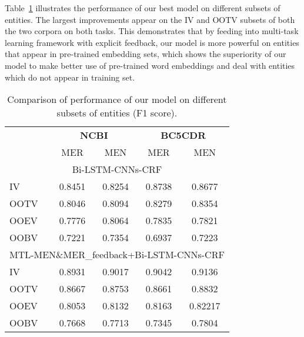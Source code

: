 Table~\ref{tab: oov_result} illustrates the performance of our best model
on different subsets of entities. 
The largest improvements appear on the IV and OOTV subsets of both the two corpora on both tasks. This demonstrates
that by feeding into multi-task learning framework with explicit feedback, our model
is more powerful on entities that appear in pre-trained embedding sets, which shows the superiority of our model to make better use of pre-trained word embeddings and deal with entities which do not appear in training set.
\begin{table}[h]
	\small
	\centering
	\begin{tabular}{l|c|c|c|c}
		\hline
		\multirow{2}{*}{}&\multicolumn{2}{c|}{\textbf{NCBI}}&\multicolumn{2}{c}{\textbf{BC5CDR}}\\
		\cline{2-5}
		\multirow{2}{*}{}& MER&MEN&MER&MEN\\
		\hline
		\multicolumn{5}{c}{Bi-LSTM-CNNs-CRF}\\
		\hdashline
		IV   &0.8451&0.8254&0.8738&0.8677\\
		OOTV &0.8046&0.8094&0.8279&0.8354\\
		OOEV &0.7776&0.8064&0.7835&0.7821\\
		OOBV &0.7221&0.7354&0.6937&0.7223\\
		\hline
		\multicolumn{5}{c}{MTL-MEN\&MER\_feedback+Bi-LSTM-CNNs-CRF}\\
		\hdashline
		IV   &0.8931&0.9017&0.9042&0.9136\\
		OOTV &0.8667&0.8753&0.8661&0.8832\\
		OOEV &0.8053&0.8132&0.8163&0.82217\\
		OOBV &0.7668&0.7713&0.7345&0.7804\\
		\hline	
	\end{tabular}
	\vspace{-0.1in}
	\caption{Comparison of performance of our model on different subsets of entities (F1 score).}\label{tab: oov_result}	
	\vspace{-0.2in}
\end{table}
